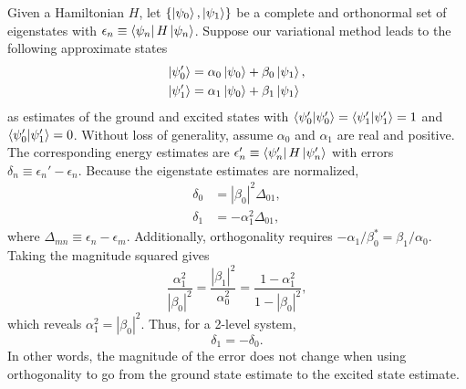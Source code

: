 \documentclass[aps,10pt,superscriptaddress,floatfix,nofootinbib,notitlepage]{revtex4-1}
\begin{document}
Given a Hamiltonian $H$, let $\{\ket{\psi_0},\ket{\psi_1}\}$ be a complete and orthonormal set of eigenstates with $\epsilon_n\equiv\bra{\psi_n}H\ket{\psi_n}$. Suppose our variational method leads to the following approximate states 
\begin{align}
    \ket{\psi_0'}
    &=\alpha_0\ket{\psi_0}+\beta_0\ket{\psi_1}, \\
    \ket{\psi_1'}
    &=\alpha_1\ket{\psi_0}+\beta_1\ket{\psi_1}
\end{align}
as estimates of the ground and excited states with $\braket{\psi_0'|\psi_0'}=\braket{\psi_1'|\psi_1'}=1$ and $\braket{\psi_0'|\psi_1'}=0$. Without loss of generality, assume $\alpha_0$ and $\alpha_1$ are real and positive. The corresponding energy estimates are $\epsilon_n'\equiv\bra{\psi_n'}H\ket{\psi_n'}$ with errors $\delta_n\equiv\epsilon_n'-\epsilon_n$. Because the eigenstate estimates are normalized,
\begin{align}
    \delta_0
    &=|\beta_0|^2\Delta_{01}, \\
    \delta_1
    &=-\alpha_1^2\Delta_{01},
\end{align}
where $\Delta_{mn}\equiv\epsilon_n-\epsilon_m$. Additionally, orthogonality requires $-\alpha_1/\beta_0^*=\beta_1/\alpha_0$. Taking the magnitude squared gives
\begin{equation}
    \frac{\alpha_1^2}{|\beta_0|^2}
    =\frac{|\beta_1|^2}{\alpha_0^2}
    =\frac{1-\alpha_1^2}{1-|\beta_0|^2},
\end{equation}
which reveals $\alpha_1^2=|\beta_0|^2$. Thus, for a 2-level system,
\begin{equation}
    \delta_1=-\delta_0.
\end{equation}
In other words, the magnitude of the error does not change when using orthogonality to go from the ground state estimate to the excited state estimate.
\end{document}
